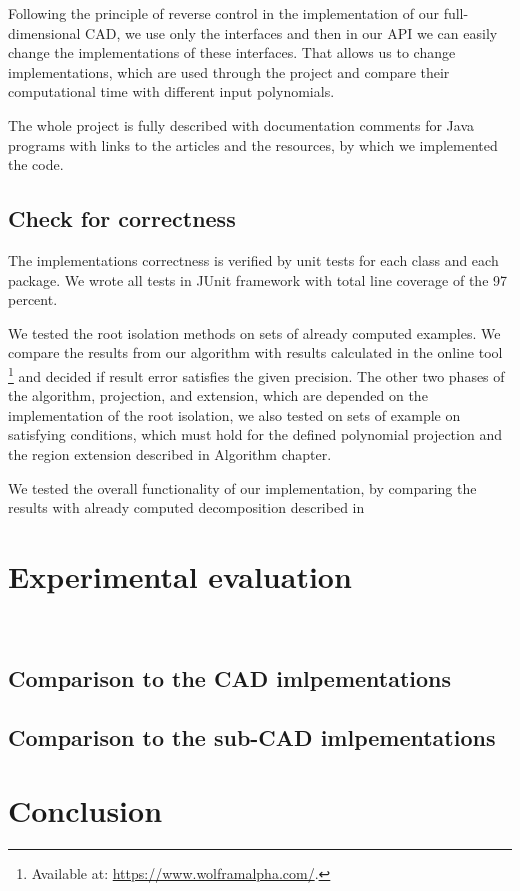 \documentclass[
  digital, %
  twoside, %
  table,   %
  nolof,     %
  nolot,     %
]{fithesis3}
\begin{document}
Following the principle of reverse control in the implementation of our full-dimensional CAD, we use only the interfaces and then in our API we can easily change the implementations of these interfaces. That allows us to change implementations, which are used through the project and compare their computational time with different input polynomials.

The whole project is fully described with documentation comments for Java programs with links to the articles and the resources, by which we implemented the code.


\section{Check for correctness}
The implementations correctness is verified by unit tests for each class and each package.
We wrote all tests in JUnit framework with total line coverage of the 97 percent.

We tested the root isolation methods on sets of already computed examples. We compare the results from our algorithm with results calculated in the online tool \footnote{
  Available at: \url{https://www.wolframalpha.com/}.
}  and decided if result error satisfies the given precision.
The other two phases of the algorithm, projection, and extension, which are depended on the implementation of the root isolation, we also tested on sets of example on satisfying conditions, which must hold for the defined polynomial projection and the region extension described in Algorithm chapter.

We tested the overall functionality of our implementation, by comparing the results with already computed  decomposition described in  


\chapter{Experimental evaluation}
\
\section{Comparison to the CAD imlpementations}
\section{Comparison to the sub-CAD imlpementations}

\chapter{Conclusion}

  \printbibliography[heading=bibintoc] %
\end{document}
